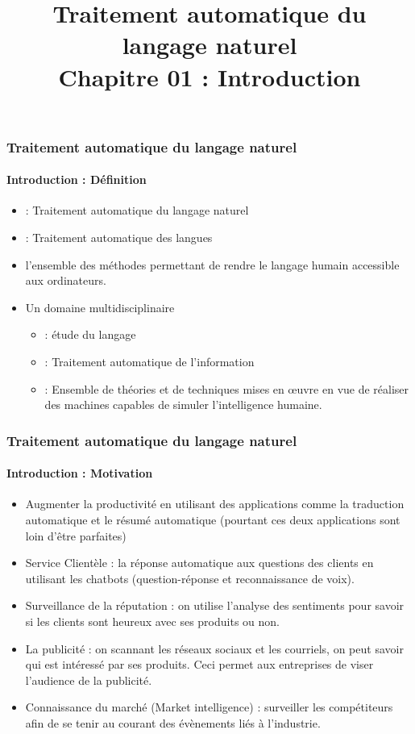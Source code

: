\documentclass{beamer}
\title[TALN : 01- Introduction]%
{Traitement automatique du langage naturel\\Chapitre 01 : Introduction}
\begin{document}
	
\begin{frame}
\frametitle{Traitement automatique du langage naturel}
\framesubtitle{Introduction : Définition}

\begin{itemize}
	\item {} : Traitement automatique du langage naturel
	\item {} : Traitement automatique des langues
	\item l'ensemble des méthodes permettant de rendre le langage humain accessible aux ordinateurs.
\end{itemize}
\begin{minipage}{0.78\textwidth}
\begin{itemize}
	\item Un domaine multidisciplinaire
	\begin{itemize}
		\item {} : étude du langage
		\item {} : Traitement automatique de l'information
		\item {} : Ensemble de théories et de techniques mises en œuvre en vue de réaliser des machines capables de simuler l'intelligence humaine.
	\end{itemize}
\end{itemize}
\end{minipage}
\begin{minipage}{0.20\textwidth}
\end{minipage}
\end{frame}

\begin{frame}
\frametitle{Traitement automatique du langage naturel}
\framesubtitle{Introduction : Motivation}

\begin{itemize}
	\item Augmenter la productivité en utilisant des applications comme la traduction automatique et le résumé automatique (pourtant ces deux applications sont loin d'être parfaites)
	
	\item Service Clientèle : la réponse automatique aux questions des clients en utilisant les chatbots (question-réponse et reconnaissance de voix). 
	
	\item Surveillance de la réputation : on utilise l'analyse des sentiments pour savoir si les clients sont heureux avec ses produits ou non. 
	
	\item La publicité : on scannant les réseaux sociaux et les courriels, on peut savoir qui est intéressé par ses produits. Ceci permet aux entreprises de viser l'audience de la publicité. 
	
	\item Connaissance du marché (Market intelligence) : surveiller les compétiteurs afin de se tenir au courant des évènements liés à l'industrie.
\end{itemize}

\end{frame}
\end{document}
